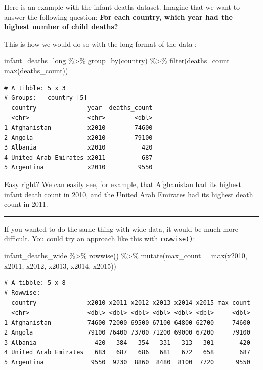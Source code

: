\documentclass[
  letterpaper,
  DIV=11,
  numbers=noendperiod]{scrreprt}
\newenvironment{Shaded}{\begin{snugshade}}{\end{snugshade}}
\newcommand{\AttributeTok}[1]{\textcolor[rgb]{0.40,0.45,0.13}{#1}}
\newcommand{\FunctionTok}[1]{\textcolor[rgb]{0.28,0.35,0.67}{#1}}
\newcommand{\NormalTok}[1]{\textcolor[rgb]{0.00,0.23,0.31}{#1}}
\newcommand{\SpecialCharTok}[1]{\textcolor[rgb]{0.37,0.37,0.37}{#1}}
\begin{document}
Here is an example with the infant deaths dataset. Imagine that we want
to answer the following question: \textbf{For each country, which year
had the highest number of child deaths?}

This is how we would do so with the long format of the data :

\begin{Shaded}
\begin{Highlighting}[]
\NormalTok{infant\_deaths\_long }\SpecialCharTok{\%\textgreater{}\%} 
  \FunctionTok{group\_by}\NormalTok{(country) }\SpecialCharTok{\%\textgreater{}\%} 
  \FunctionTok{filter}\NormalTok{(deaths\_count }\SpecialCharTok{==} \FunctionTok{max}\NormalTok{(deaths\_count))}
\end{Highlighting}
\end{Shaded}

\begin{verbatim}
# A tibble: 5 x 3
# Groups:   country [5]
  country              year  deaths_count
  <chr>                <chr>        <dbl>
1 Afghanistan          x2010        74600
2 Angola               x2010        79100
3 Albania              x2010          420
4 United Arab Emirates x2011          687
5 Argentina            x2010         9550
\end{verbatim}

Easy right? We can easily see, for example, that Afghanistan had its
highest infant death count in 2010, and the United Arab Emirates had its
highest death count in 2011.

\begin{center}\rule{0.5\linewidth}{0.5pt}\end{center}

If you wanted to do the same thing with wide data, it would be much more
difficult. You could try an approach like this with \texttt{rowwise()}:

\begin{Shaded}
\begin{Highlighting}[]
\NormalTok{infant\_deaths\_wide }\SpecialCharTok{\%\textgreater{}\%} 
  \FunctionTok{rowwise}\NormalTok{() }\SpecialCharTok{\%\textgreater{}\%} 
  \FunctionTok{mutate}\NormalTok{(}\AttributeTok{max\_count =} \FunctionTok{max}\NormalTok{(x2010, x2011, x2012, x2013, x2014, x2015))}
\end{Highlighting}
\end{Shaded}

\begin{verbatim}
# A tibble: 5 x 8
# Rowwise: 
  country              x2010 x2011 x2012 x2013 x2014 x2015 max_count
  <chr>                <dbl> <dbl> <dbl> <dbl> <dbl> <dbl>     <dbl>
1 Afghanistan          74600 72000 69500 67100 64800 62700     74600
2 Angola               79100 76400 73700 71200 69000 67200     79100
3 Albania                420   384   354   331   313   301       420
4 United Arab Emirates   683   687   686   681   672   658       687
5 Argentina             9550  9230  8860  8480  8100  7720      9550
\end{verbatim}
\end{document}

